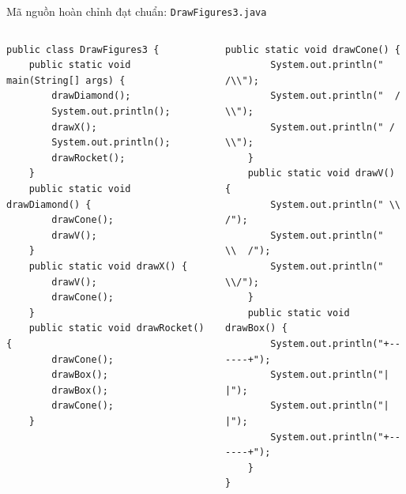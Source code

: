\documentclass[aspectratio=169, 10pt]{beamer}
\begin{document}
\begin{frame}[fragile]{Mã nguồn hoàn chỉnh đạt chuẩn: \texttt{DrawFigures3.java}}
  \begin{columns}[t]
    \begin{lstlisting}[caption={Tầng 1 \& Tầng 2}]
public class DrawFigures3 {
    public static void main(String[] args) {
        drawDiamond();
        System.out.println();
        drawX();
        System.out.println();
        drawRocket();
    }
    public static void drawDiamond() {
        drawCone();
        drawV();
    }
    public static void drawX() {
        drawV();
        drawCone();
    }
    public static void drawRocket() {
        drawCone();
        drawBox();
        drawBox();
        drawCone();
    }
    \end{lstlisting}

    \begin{lstlisting}[caption={Tầng 3 (Primitives Reusable)}]
    public static void drawCone() {
        System.out.println("   /\\");
        System.out.println("  /  \\");
        System.out.println(" /    \\");
    }
    public static void drawV() {
        System.out.println(" \\    /");
        System.out.println("  \\  /");
        System.out.println("   \\/");
    }
    public static void drawBox() {
        System.out.println("+------+");
        System.out.println("|      |");
        System.out.println("|      |");
        System.out.println("+------+");
    }
}
    \end{lstlisting}
  \end{columns}
\end{frame}
\end{document}
